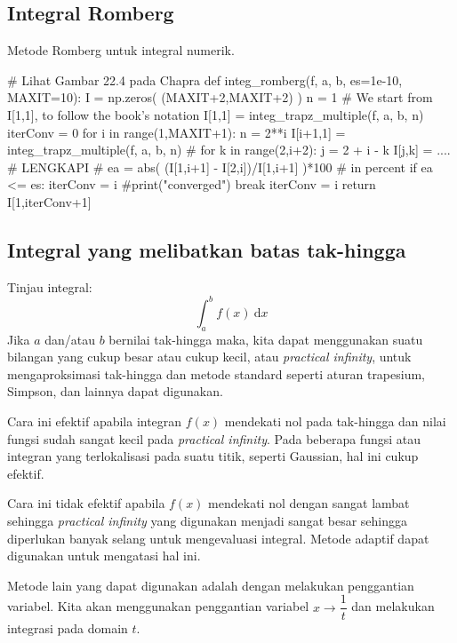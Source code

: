\subsection*{Integral Romberg}
Metode Romberg untuk integral numerik.
\begin{pythoncode}
# Lihat Gambar 22.4 pada Chapra
def integ_romberg(f, a, b, es=1e-10, MAXIT=10):
    I = np.zeros( (MAXIT+2,MAXIT+2) )
    n = 1
    # We start from I[1,1], to follow the book's notation
    I[1,1] = integ_trapz_multiple(f, a, b, n)
    iterConv = 0
    for i in range(1,MAXIT+1):
        n = 2**i
        I[i+1,1] = integ_trapz_multiple(f, a, b, n)
        #
        for k in range(2,i+2):
            j = 2 + i - k
            I[j,k] = .... # LENGKAPI
        #
        ea = abs( (I[1,i+1] - I[2,i])/I[1,i+1] )*100 # in percent
        if ea <= es:
            iterConv = i
            #print("converged")
            break
        iterConv = i
    return I[1,iterConv+1]
\end{pythoncode}


\subsection*{Integral yang melibatkan batas tak-hingga}
Tinjau integral:
\begin{equation}
\int_{a}^{b} f(x)\ \mathrm{d}x
\label{eq:orig_integ}
\end{equation}
Jika $a$ dan/atau $b$ bernilai tak-hingga maka, kita dapat menggunakan suatu bilangan
yang cukup besar atau cukup kecil, atau \textit{practical infinity},
untuk mengaproksimasi tak-hingga dan metode
standard seperti aturan trapesium, Simpson, dan lainnya dapat digunakan.

Cara ini efektif apabila integran $f(x)$ mendekati nol pada tak-hingga dan nilai fungsi
sudah sangat kecil pada \textit{practical infinity}.
Pada beberapa fungsi atau integran yang terlokalisasi pada suatu titik, seperti Gaussian,
hal ini cukup efektif.

Cara ini tidak efektif apabila $f(x)$ mendekati nol dengan sangat lambat sehingga
\textit{practical infinity} yang digunakan menjadi sangat besar sehingga diperlukan
banyak selang untuk mengevaluasi integral. Metode adaptif dapat digunakan untuk
mengatasi hal ini.

Metode lain yang dapat digunakan adalah dengan melakukan penggantian variabel.
Kita akan menggunakan penggantian variabel $x \rightarrow \dfrac{1}{t}$ dan melakukan
integrasi pada domain $t$.

